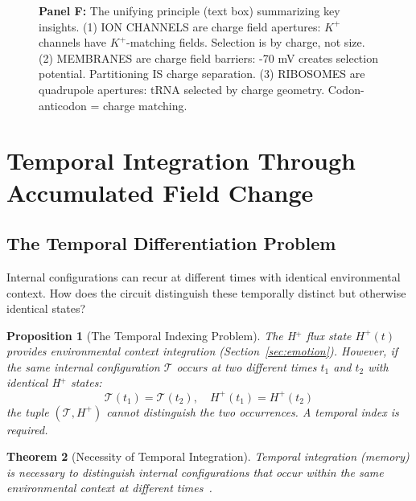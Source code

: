 \documentclass[aps,prd,twocolumn,superscriptaddress,floatfix,nofootinbib]{revtex4-2}
\newtheorem{theorem}{Theorem}[section]
\newtheorem{proposition}[theorem]{Proposition}
\theoremstyle{remark}
\begin{document}
\begin{figure}[!htbp]
{\textbf{Panel F:} The unifying principle (text box) summarizing key insights. (1) ION CHANNELS are charge field apertures: $K^{+}$ channels have $K^{+}$-matching fields. Selection is by charge, not size. (2) MEMBRANES are charge field barriers: -70 mV creates selection potential. Partitioning IS charge separation. (3) RIBOSOMES are quadrupole apertures: tRNA selected by charge geometry. Codon-anticodon = charge matching. }
\label{fig:apertures_charge_fields}
\end{figure}


\section{Temporal Integration Through Accumulated Field Change}
\label{sec:memory}

\subsection{The Temporal Differentiation Problem}

Internal configurations can recur at different times with identical environmental context. How does the circuit distinguish these temporally distinct but otherwise identical states?

\begin{proposition}[The Temporal Indexing Problem]
\label{prop:prediction}
The H$^+$ flux state $H^+(t)$ provides environmental context integration (Section~\ref{sec:emotion}). However, if the same internal configuration $\mathcal{T}$ occurs at two different times $t_1$ and $t_2$ with identical H$^+$ states:
\begin{equation}
\mathcal{T}(t_1) = \mathcal{T}(t_2), \quad H^+(t_1) = H^+(t_2)
\end{equation}
the tuple $(\mathcal{T}, H^+)$ cannot distinguish the two occurrences. A temporal index is required.
\end{proposition}

\begin{theorem}[Necessity of Temporal Integration]
\label{thm:memory_necessity}
Temporal integration (memory) is necessary to distinguish internal configurations that occur within the same environmental context at different times~\cite{tulving1972episodic,squire2004memory}.
\end{theorem}
\end{document}
